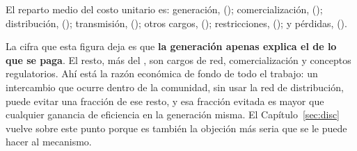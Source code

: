 El reparto medio del costo unitario es:
generación,  (); comercialización,
 (); distribución,  ();
transmisión,  (); otros cargos, 
(); restricciones,  (); y pérdidas,
 ().

\begin{lecturabox}
La cifra que esta figura deja es que \textbf{la generación apenas explica
el  de lo que se paga}. El resto, más del
, son cargos de red, comercialización y conceptos regulatorios. Ahí
está la razón económica de fondo de todo el trabajo: un intercambio que
ocurre dentro de la comunidad, sin usar la red de distribución, puede
evitar una fracción de ese resto, y esa fracción evitada es mayor
que cualquier ganancia de eficiencia en la generación misma. El
Capítulo~\ref{sec:disc} vuelve sobre este punto porque es también la
objeción más seria que se le puede hacer al mecanismo.
\end{lecturabox}

